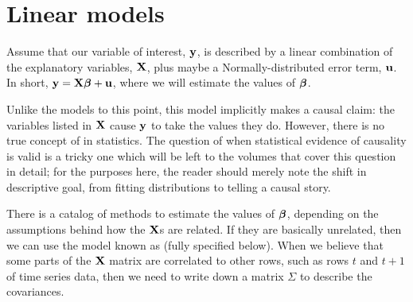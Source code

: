 



\section{Linear models}
\label{cat}

Assume that our variable of interest, ${\bf y}$, is
described by a linear combination of the explanatory variables, ${\bf X}$,
plus maybe a Normally-distributed error term, ${\bf u}$. In short,
${\bf y}={\bf X}{\mbox{\boldmath$\beta$}} + {\bf u}$, where we will estimate the values of ${\mbox{\boldmath$\beta$}}$. 

Unlike the models to this point, this model implicitly makes a
causal claim: the variables listed in ${\bf X}$ cause ${\bf y}$ to take the values they
do. However, 
there is no true concept of  in statistics.
The question of when statistical evidence of causality is valid is a tricky
one which will be left to the volumes that cover this question in
detail; for the purposes here, the reader should merely note the shift in
descriptive goal, from fitting distributions to telling a causal story.

There is a catalog of methods to estimate the values of ${\mbox{\boldmath$\beta$}}$,
depending on the assumptions behind how the ${\bf X}$s are related. If they
are basically unrelated, then we can use the model known as  (fully specified below). When we believe that some parts
of the ${\bf X}$ matrix are correlated to other rows, such as rows $t$ and
$t+1$ of 
time series data, then we need to write down a matrix
$\Sigma$ to describe the covariances.


